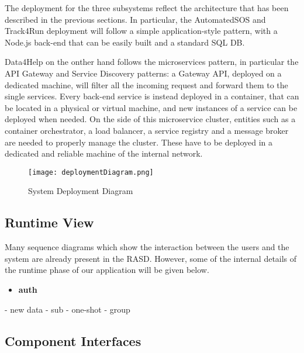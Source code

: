 The deployment for the three subsystems reflect the architecture that has been described in the previous sections. In particular, the AutomatedSOS and Track4Run deployment will follow a simple application-style pattern, with a Node.js back-end that can be easily built and a standard SQL DB.

Data4Help on the onther hand follows the microservices pattern, in particular the API Gateway and Service Discovery patterns: a Gateway API, deployed on a dedicated machine, will filter all the incoming request and forward them to the single services. Every back-end service is instead deployed in a container, that can be located in a physical or virtual machine, and new instances of a service can be deployed when needed. On the side of this microservice cluster, entities such as a container orchestrator, a load balancer, a service registry and a message broker are needed to properly manage the cluster. These have to be deployed in a dedicated and reliable machine of the internal network.

\FloatBarrier
\begin{figure}[!h]
	\centering
	\texttt{[image: deploymentDiagram.png]}
	\caption{System Deployment Diagram}
\end{figure}
\FloatBarrier

\subsection{Runtime View}
Many sequence diagrams which show the interaction between the users and the system are already present in the RASD. However, some of the internal details of the runtime phase of our application will be given below.

\begin{itemize}
	\item \textbf{auth}
\end{itemize}
	
- new data
- sub
- one-shot
- group

\subsection{Component Interfaces}

